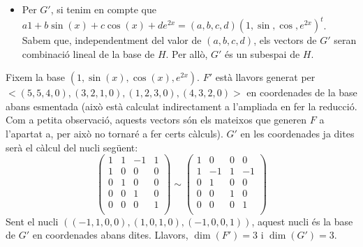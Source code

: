 \documentclass[a4paper, 12pt]{article}
\begin{document}
\begin{solucio}
\begin{itemize}
\begin{displaymath}
                \right)
            \end{displaymath}
            Com podem veure, els vectors generadors de $F'$ desapareixen en reduir la matriu,
            per això $F'$ és un subespai de $H$.
            \item Per $G'$, si tenim en compte que $a1 + b\sin(x) + c\cos(x) + de^{2x} = (a, b, c, d)(1,\sin,\cos,e^{2x})^t$.
            Sabem que, independentment del valor de $(a, b, c, d)$, els vectors de $G'$ seran
            combinació lineal de la base de $H$. Per allò, $G'$ és un subespai de $H$. 
        \end{itemize}
        Fixem la base $(1, \sin(x), \cos(x), e^{2x})$. $F'$ està llavors generat per $<(5, 5, 4, 0), (3, 2, 1, 0), (1, 2, 3, 0), (4, 3, 2, 0)>$
        en coordenades de la base abans esmentada (això està calculat indirectament a l'ampliada en
        fer la reducció. Com a petita observació, aquests vectors són els mateixos que generen $F$
        a l'apartat a, per això no tornaré a fer certs càlculs). $G'$ en les coordenades ja dites serà el càlcul del nucli següent:
        \begin{displaymath}
            \left(
                \begin{array}{cccc}
                    1 & 1 & -1 & 1\\
                    \hline
                    1 & 0 & 0 & 0\\
                    0 & 1 & 0 & 0\\
                    0 & 0 & 1 & 0\\
                    0 & 0 & 0 & 1\\
                \end{array}
            \right)
            \sim
            \left(
                \begin{array}{cccc}
                    1 & 0 & 0 & 0\\
                    \hline
                    1 & -1 & 1 & -1\\
                    0 & 1 & 0 & 0\\
                    0 & 0 & 1 & 0\\
                    0 & 0 & 0 & 1\\
                \end{array}
            \right)
        \end{displaymath}
        Sent el nucli $((-1, 1, 0, 0), (1, 0, 1, 0), (-1, 0, 0, 1))$, aquest nucli és la base de $G'$
        en coordenades abans dites.
        Llavors, $\dim(F') = 3$ i $\dim(G') = 3$.
    \end{solucio}
    
\end{document}
